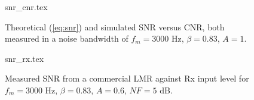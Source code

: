 \documentclass{article}
\begin{document}
\begin{figure}[h]
\caption{Theoretical (\ref{eq:snr}) and simulated SNR versus CNR, both measured in a noise bandwidth of $f_m=3000$ Hz, $\beta=0.83$, $A=1$.}
\label{fig:snr_cnr}
\begin{center}
 {snr_cnr.tex}
\end{center}
\end{figure}

\begin{figure}[h]
\caption{Measured SNR from a commercial LMR against Rx input level for $f_m=3000$ Hz, $\beta=0.83$, $A=0.6$, $NF=5$ dB.}
\label{fig:snr_rx}
\begin{center}
 {snr_rx.tex}
\end{center}
\end{figure}



\end{document}
